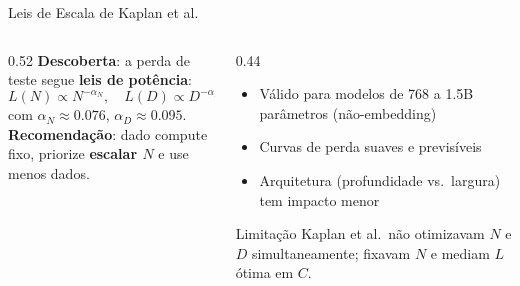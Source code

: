 \documentclass[aspectratio=169, xcolor=dvipsnames]{beamer}
\begin{document}
  \begin{frame}{Leis de Escala de Kaplan et al.\ \cite{kaplan2020scaling}}
    \begin{columns}[T]
      \begin{column}{0.52\textwidth}
        \textbf{Descoberta}: a perda de teste segue \textbf{leis de potência}:
        \[
          L(N) \propto N^{-\alpha_N}, \quad
          L(D) \propto D^{-\alpha_D}
        \]
        com $\alpha_N \approx 0.076$, $\alpha_D \approx 0.095$.\\[0.5em]
        \textbf{Recomendação}: dado compute fixo, priorize \textbf{escalar $N$} e use menos dados.
      \end{column}
      \begin{column}{0.44\textwidth}
        \begin{itemize}
          \item Válido para modelos de 768 a 1.5B parâmetros (não-embedding)
          \item Curvas de perda suaves e previsíveis
          \item Arquitetura (profundidade vs.\ largura) tem impacto menor
        \end{itemize}
        \vspace{0.3em}
        \begin{alertblock}{Limitação}
          Kaplan et al.\ não otimizavam $N$ e $D$ simultaneamente; fixavam $N$ e mediam $L$ ótima em $C$.
        \end{alertblock}
      \end{column}
    \end{columns}
  \end{frame}
\end{document}
